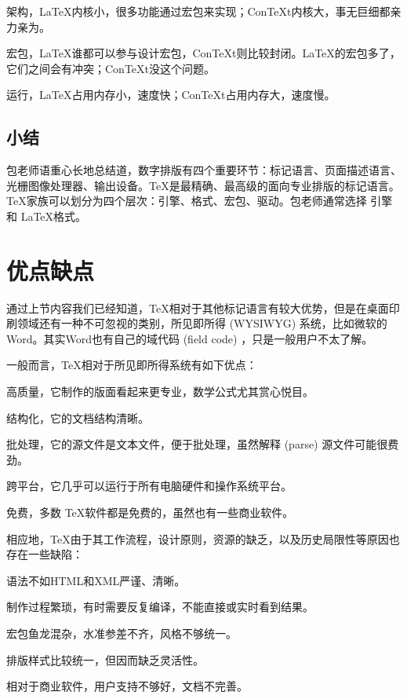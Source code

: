 \begin{compactitem}
    \item 架构，\LaTeX 内核小，很多功能通过宏包来实现；Con\TeX t内核大，事无巨细都亲力亲为。
    \item 宏包，\LaTeX 谁都可以参与设计宏包，Con\TeX t则比较封闭。\LaTeX 的宏包多了，它们之间会有冲突；Con\TeX t没这个问题。
    \item 运行，\LaTeX 占用内存小，速度快；Con\TeX t占用内存大，速度慢。
\end{compactitem}

\subsection{小结}

包老师语重心长地总结道，数字排版有四个重要环节：标记语言、页面描述语言、光栅图像处理器、输出设备。\TeX 是最精确、最高级的面向专业排版的标记语言。\TeX 家族可以划分为四个层次：引擎、格式、宏包、驱动。包老师通常选择 \XeTeX 引擎和 \LaTeX 格式。

\section{优点缺点}

通过上节内容我们已经知道，\TeX 相对于其他标记语言有较大优势，但是在桌面印刷领域还有一种不可忽视的类别，所见即所得 (WYSIWYG) 系统，比如微软\indexMSFT{}的Word。其实Word也有自己的域代码 (field code) ，只是一般用户不太了解。

一般而言，\TeX 相对于所见即所得系统有如下优点：
\begin{compactitem}
   \item 高质量，它制作的版面看起来更专业，数学公式尤其赏心悦目。
   \item 结构化，它的文档结构清晰。
   \item 批处理，它的源文件是文本文件，便于批处理，虽然解释 (parse) 源文件可能很费劲。
   \item 跨平台，它几乎可以运行于所有电脑硬件和操作系统平台。
   \item 免费，多数 \TeX 软件都是免费的，虽然也有一些商业软件。
\end{compactitem}

相应地，\TeX 由于其工作流程，设计原则，资源的缺乏，以及历史局限性等原因也存在一些缺陷：
\begin{compactitem}
   \item 语法不如HTML和XML严谨、清晰。
   \item 制作过程繁琐，有时需要反复编译，不能直接或实时看到结果。
   \item 宏包鱼龙混杂，水准参差不齐，风格不够统一。
   \item 排版样式比较统一，但因而缺乏灵活性。
   \item 相对于商业软件，用户支持不够好，文档不完善。
\end{compactitem}

